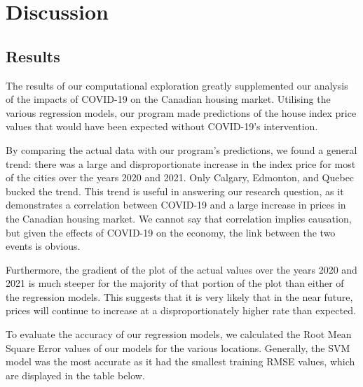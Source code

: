\documentclass{article}
\begin{document}
\section{Discussion}

\subsection{Results}
The results of our computational exploration greatly supplemented our analysis of the impacts of COVID-19 on the Canadian housing market. Utilising the various regression models, our program made predictions of the house index price values that would have been expected without COVID-19's intervention.

By comparing the actual data with our program's predictions, we found a general trend: there was a large and disproportionate increase in the index price for most of the cities over the years 2020 and 2021. Only Calgary, Edmonton, and Quebec bucked the trend. This trend is useful in answering our research question, as it demonstrates a correlation between COVID-19 and a large increase in prices in the Canadian housing market. We cannot say that correlation implies causation, but given the effects of COVID-19 on the economy, the link between the two events is obvious.

Furthermore, the gradient of the plot of the actual values over the years 2020 and 2021 is much steeper for the majority of that portion of the plot than either of the regression models. This suggests that it is very likely that in the near future, prices will continue to increase at a disproportionately higher rate than expected.

To evaluate the accuracy of our regression models, we calculated the Root Mean Square Error values of our models for the various locations. Generally, the SVM model was the most accurate as it had the smallest training RMSE values, which are displayed in the table below.
\end{document}
